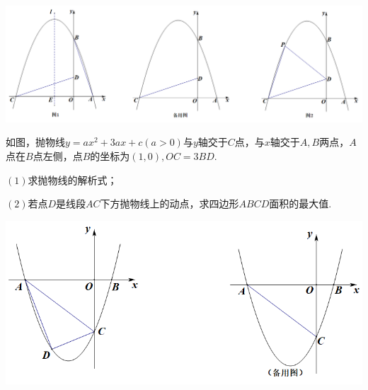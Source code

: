 \documentclass[10pt]{ctexart}
\begin{document}
\centering
\includegraphics[scale=0.45]{figure/g-29.PNG} 
\begin{jply}{}{}
  如图，抛物线$y=ax^2+3ax+c(a>0)$与$y$轴交于$C$点，与$x$轴交于$A,B$两点，$A$点在$B$点左侧，点$B$的坐标为$(1,0),OC=3BD$.
  
  $(1)$求抛物线的解析式；
  
  $(2)$若点$D$是线段$AC$下方抛物线上的动点，求四边形$ABCD$面积的最大值.
\end{jply}

\centering
\includegraphics[scale=0.6]{figure/g-30.PNG} 
\end{document}
